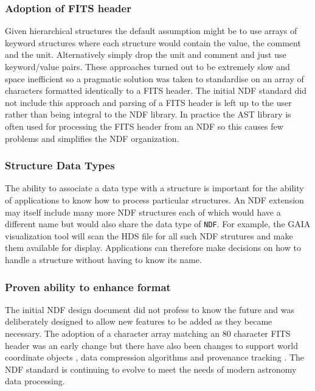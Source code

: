 \documentclass[final,authoryear,5p,times,twocolumn]{elsarticle}
\begin{document}
\subsubsection{Adoption of FITS header}

Given hierarchical structures the default assumption might be to use
arrays of keyword structures where each structure would contain the
value, the comment and the unit. Alternatively simply drop the unit
and comment and just use keyword/value pairs. These approaches turned
out to be extremely slow and space inefficient so a pragmatic solution
was taken to standardise on an array of characters formatted
identically to a FITS header. The initial NDF standard did not include
this approach and parsing of a FITS header is left up to the user
rather than being integral to the NDF library. In practice the AST
library \citep{1998ASPC..145...41W} is often used for processing the FITS
header from an NDF so this causes few problems and simplifies the NDF
organization.

\subsubsection{Structure Data Types}

The ability to associate a data type with a structure is important for
the ability of applications to know how to process particular
structures. An NDF extension may itself include many more NDF
structures each of which would have a different name but would also
share the data type of \texttt{NDF}. For example, the GAIA
visualization tool \citep{2009ASPC..411..575D} will scan the HDS file
for all such NDF strutures and make them available for
display. Applications can therefore make decisions on how to handle a
structure without having to know its name.

\subsubsection{Proven ability to enhance format}

The initial NDF design document did not profess to know the future and
was deliberately designed to allow new features to be added as they
became necessary. The adoption of a character array matching an 80
character FITS header was an early change but there have also been
changes to support world coordinate objects
\citep{2001ASPC..238..129B}, data compression algorithms
\citep{2008ASPC..394..650C} and provenance tracking
\citep{2009ASPC..411..418J}. The NDF standard is continuing to evolve
to meet the needs of modern astronomy data processing.
\end{document}
